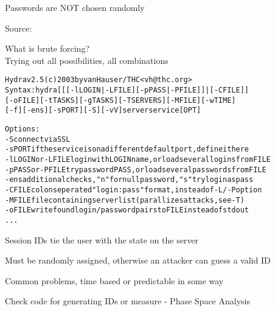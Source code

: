 \documentclass[Screen16to9,17pt]{foils}
\begin{document}

Passwords are NOT chosen randomly


Source:


\begin{list1}
\item What is brute forcing?\\
Trying out all possibilities, all combinations
\end{list1}

\begin{alltt}\footnotesize
Hydra v2.5 (c) 2003 by van Hauser / THC <vh@thc.org>
Syntax: hydra [[[-l LOGIN|-L FILE] [-p PASS|-P FILE]] | [-C FILE]]
[-o FILE] [-t TASKS] [-g TASKS] [-T SERVERS] [-M FILE] [-w TIME]
[-f] [-e ns] [-s PORT] [-S] [-vV] server service [OPT]

Options:
  -S        connect via SSL
  -s PORT   if the service is on a different default port, define it here
  -l LOGIN  or -L FILE login with LOGIN name, or load several logins from FILE
  -p PASS   or -P FILE try password PASS, or load several passwords from FILE
  -e ns     additional checks, "n" for null password, "s" try login as pass
  -C FILE   colon seperated "login:pass" format, instead of -L/-P option
  -M FILE   file containing server list (parallizes attacks, see -T)
  -o FILE   write found login/password pairs to FILE instead of stdout
...
\end{alltt}





\begin{list2}
\item Session IDs tie the user with the state on the server
\item Must be randomly assigned, otherwise an attacker can guess a valid ID
\item Common problems, time based or predictable in some way
\item Check code for generating IDs or measure - Phase Space Analysis
\end{list2}





\slidenext{}
\end{document}
